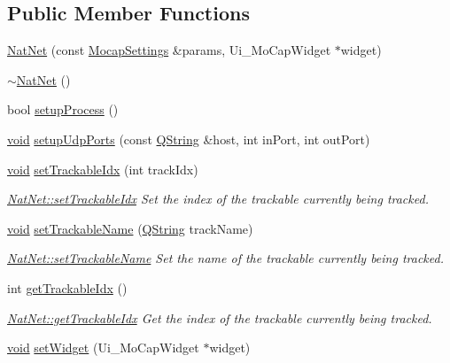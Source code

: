 \subsection*{\-Public \-Member \-Functions}
\begin{DoxyCompactItemize}
\item 
\hyperlink{group___mo_cap_plugin_gaa94c0d1f5d60294b81cdb7d04f50c13e}{\-Nat\-Net} (const \hyperlink{group___mo_cap_plugin_ga6083347a5b3eb70e360f599354dc0f0b}{\-Mocap\-Settings} \&params, \-Ui\-\_\-\-Mo\-Cap\-Widget $\ast$widget)
\item 
\hyperlink{group___mo_cap_plugin_ga119cde1cc51a6b41f0e064565467c398}{$\sim$\-Nat\-Net} ()
\item 
bool \hyperlink{group___mo_cap_plugin_gaec62d88408f6c898d9cd6b6192b7dec8}{setup\-Process} ()
\item 
\hyperlink{group___u_a_v_objects_plugin_ga444cf2ff3f0ecbe028adce838d373f5c}{void} \hyperlink{group___mo_cap_plugin_gad51f36a3cda11c275da178b2e55ae688}{setup\-Udp\-Ports} (const \hyperlink{group___u_a_v_objects_plugin_gab9d252f49c333c94a72f97ce3105a32d}{\-Q\-String} \&host, int in\-Port, int out\-Port)
\item 
\hyperlink{group___u_a_v_objects_plugin_ga444cf2ff3f0ecbe028adce838d373f5c}{void} \hyperlink{group___mo_cap_plugin_ga92f0c84eeffa49fd021a9c5ad837947a}{set\-Trackable\-Idx} (int track\-Idx)
\begin{DoxyCompactList}\small\item\em \hyperlink{group___mo_cap_plugin_ga92f0c84eeffa49fd021a9c5ad837947a}{\-Nat\-Net\-::set\-Trackable\-Idx} \-Set the index of the trackable currently being tracked. \end{DoxyCompactList}\item 
\hyperlink{group___u_a_v_objects_plugin_ga444cf2ff3f0ecbe028adce838d373f5c}{void} \hyperlink{group___mo_cap_plugin_gac1813312de25d16f42e41c5ffd3ced8c}{set\-Trackable\-Name} (\hyperlink{group___u_a_v_objects_plugin_gab9d252f49c333c94a72f97ce3105a32d}{\-Q\-String} track\-Name)
\begin{DoxyCompactList}\small\item\em \hyperlink{group___mo_cap_plugin_gac1813312de25d16f42e41c5ffd3ced8c}{\-Nat\-Net\-::set\-Trackable\-Name} \-Set the name of the trackable currently being tracked. \end{DoxyCompactList}\item 
int \hyperlink{group___mo_cap_plugin_gabf29127f9bdc7e4667b0d495812ec2a0}{get\-Trackable\-Idx} ()
\begin{DoxyCompactList}\small\item\em \hyperlink{group___mo_cap_plugin_gabf29127f9bdc7e4667b0d495812ec2a0}{\-Nat\-Net\-::get\-Trackable\-Idx} \-Get the index of the trackable currently being tracked. \end{DoxyCompactList}\item 
\hyperlink{group___u_a_v_objects_plugin_ga444cf2ff3f0ecbe028adce838d373f5c}{void} \hyperlink{group___mo_cap_plugin_ga5c9af1ea346e9baf803728c2e0f94dc8}{set\-Widget} (\-Ui\-\_\-\-Mo\-Cap\-Widget $\ast$widget)
\end{DoxyCompactItemize}


